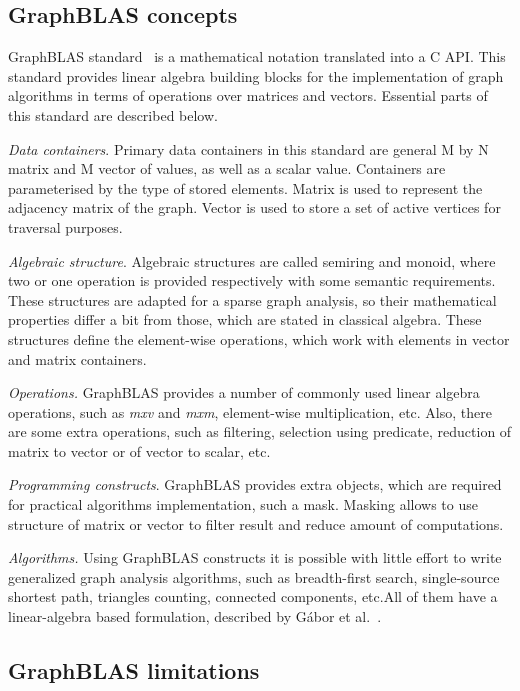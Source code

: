 \subsection{GraphBLAS concepts}

GraphBLAS standard~\cite{7761646} is a mathematical notation translated into a C API. This standard provides linear algebra building blocks for the implementation of graph algorithms in terms of operations over matrices and vectors. Essential parts of this standard are described below.

\textit{Data containers}. Primary data containers in this standard are general M by N matrix and M vector of values, as well as a scalar value. Containers are parameterised by the type of stored elements. Matrix is used to represent the adjacency matrix of the graph. Vector is used to store a set of active vertices for traversal purposes. 

\textit{Algebraic structure}. Algebraic structures are called semiring and monoid, where two or one operation is provided respectively with some semantic requirements. These structures are adapted for a sparse graph analysis, so their mathematical properties differ a bit from those, which are stated in classical algebra. These structures define the element-wise operations, which work with elements in vector and matrix containers. 

\textit{Operations.} GraphBLAS provides a number of commonly used linear algebra operations, such as \textit{mxv} and \textit{mxm}, element-wise multiplication, etc. Also, there are some extra operations, such as filtering, selection using predicate, reduction of matrix to vector or of vector to scalar, etc.

\textit{Programming constructs}. GraphBLAS provides extra objects, which are required for practical algorithms implementation, such a mask. Masking allows to use structure of matrix or vector to filter result and reduce amount of computations.

\textit{Algorithms.} Using GraphBLAS constructs it is possible with little effort to write generalized graph analysis algorithms, such as breadth-first search, single-source shortest path, triangles counting, connected components, etc.All of them have a linear-algebra based formulation, described by Gábor et al.~\cite{szarnyas2021lagraph}.

\subsection{GraphBLAS limitations}

